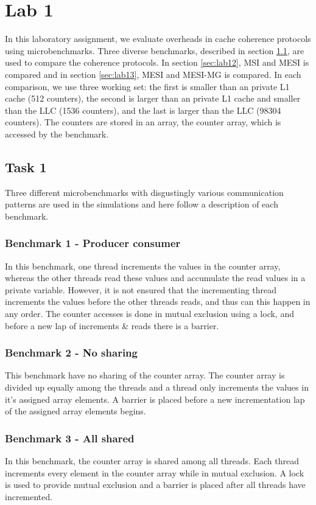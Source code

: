 \section{Lab 1}
\label{sec:lab1}
In this laboratory assignment, we evaluate overheads in cache coherence protocols using microbenchmarks. Three diverse benchmarks, described in section \ref{sec:lab11}, are used to compare the coherence protocols. In section \ref{sec:lab12}, MSI and MESI is compared and in section \ref{sec:lab13}, MESI and MESI-MG is compared. In each comparison, we use three working set: the first is smaller than an private L1 cache (512 counters), the second is larger than an private L1 cache and smaller than the LLC (1536 counters), and the last is larger than the LLC (98304 counters). The counters are stored in an array, the counter array, which is accessed by the benchmark.

\subsection{Task 1}
\label{sec:lab11}
Three different microbenchmarks with disgustingly various communication patterns are used in the simulations and here follow a description of each benchmark.
\subsubsection*{Benchmark 1 - Producer consumer}
In this benchmark, one thread increments the values in the counter array, whereas the other threads read these values and accumulate the read values in a private variable. However, it is not ensured that the incrementing thread increments the values before the other threads reads, and thus can this happen in any order. The counter accesses is done in mutual exclusion using a lock, and before a new lap of increments \& reads there is a barrier.

\subsubsection*{Benchmark 2 - No sharing}
This benchmark have no sharing of the counter array. The counter array is divided up equally among the threads and a thread only increments the values in it's assigned array elements. A barrier is placed before a new incrementation lap of the assigned array elements begins. 

\subsubsection*{Benchmark 3 - All shared}
In this benchmark, the counter array is shared among all threads. Each thread increments every element in the counter array while in mutual exclusion. A lock is used to provide mutual exclusion and a barrier is placed after all threads have incremented. 

